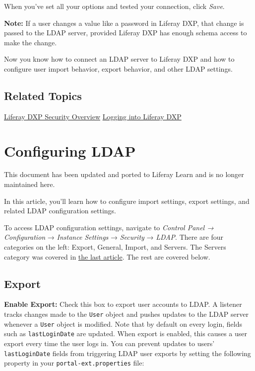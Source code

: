 When you've set all your options and tested your connection, click
\emph{Save}.

\noindent\hrulefill

\textbf{Note:} If a user changes a value like a password in Liferay DXP,
that change is passed to the LDAP server, provided Liferay DXP has
enough schema access to make the change.

\noindent\hrulefill

Now you know how to connect an LDAP server to Liferay DXP and how to
configure user import behavior, export behavior, and other LDAP
settings.

\section{Related Topics}\label{related-topics-5}

\href{/docs/7-0/deploy/-/knowledge_base/d/liferay-portal-security-overview}{Liferay
DXP Security Overview}
\href{/docs/7-0/deploy/-/knowledge_base/d/logging-in-to-liferay}{Logging
into Liferay DXP}

\chapter{Configuring LDAP}\label{configuring-ldap}

{This document has been updated and ported to Liferay Learn and is no
longer maintained here.}

In this article, you'll learn how to configure import settings, export
settings, and related LDAP configuration settings.

To access LDAP configuration settings, navigate to \emph{Control Panel →
Configuration} → \emph{Instance Settings} → \emph{Security} →
\emph{LDAP}. There are four categories on the left: Export, General,
Import, and Servers. The Servers category was covered in
\href{/docs/7-2/deploy/-/knowledge_base/d/ldap}{the last article}. The
rest are covered below.

\section{Export}\label{export-1}

\textbf{Enable Export:} Check this box to export user accounts to LDAP.
A listener tracks changes made to the \texttt{User} object and pushes
updates to the LDAP server whenever a \texttt{User} object is modified.
Note that by default on every login, fields such as
\texttt{lastLoginDate} are updated. When export is enabled, this causes
a user export every time the user logs in. You can prevent updates to
users' \texttt{lastLoginDate} fields from triggering LDAP user exports
by setting the following property in your \texttt{portal-ext.properties}
file:

